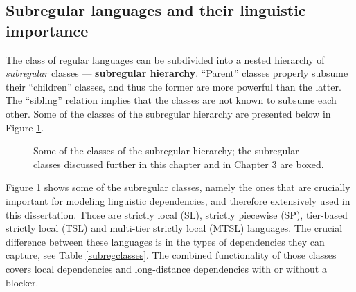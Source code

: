 \subsection{Subregular languages and their linguistic importance}
\label{subgsgf}

The class of regular languages can be subdivided into a nested hierarchy of \emph{subregular} classes --- \textbf{subregular hierarchy}.
``Parent'' classes properly subsume their ``children'' classes, and thus the former are more powerful than the latter.
The ``sibling'' relation implies that the classes are not known to subsume each other.
Some of the classes of the subregular hierarchy are presented below in Figure \ref{subreghier}.

\begin{figure}[h!]
\begin{center}
\caption{Some of the classes of the subregular hierarchy; the subregular classes discussed further in this chapter and in Chapter 3 are boxed.}
\label{subreghier}
\end{center}
\end{figure}

Figure \ref{subreghier} shows some of the subregular classes, namely the ones that are crucially important for modeling linguistic dependencies, and therefore extensively used in this dissertation.
Those are strictly local (SL), strictly piecewise (SP), tier-based strictly local (TSL) and multi-tier strictly local (MTSL) languages.
The crucial difference between these languages is in the types of dependencies they can capture, see Table \ref{subregclasses}.
The combined functionality of those classes covers local dependencies and long-distance dependencies with or without a blocker.


